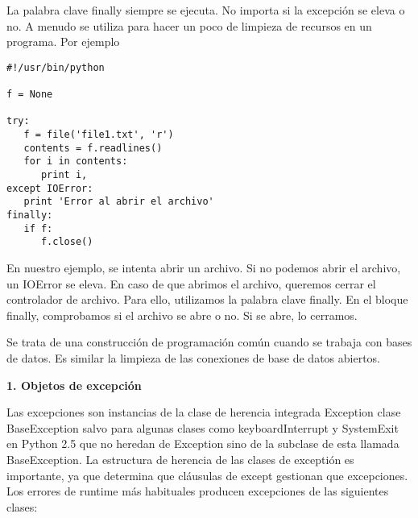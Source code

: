 \documentclass[twoside,10.5pt]{article}%
\begin{document}
\vspace{0.3cm}

La palabra clave {\color{red} finally } siempre se ejecuta. No importa si la excepci\'on se eleva o no. A menudo se utiliza para hacer un poco de limpieza de recursos en un programa. Por ejemplo

\vspace{0.3cm}

\begin{verbatim}
#!/usr/bin/python

f = None

try:
   f = file('file1.txt', 'r')
   contents = f.readlines()
   for i in contents:
      print i,
except IOError:
   print 'Error al abrir el archivo'
finally:
   if f:
      f.close()
\end{verbatim}

\vspace{0.3cm}

En nuestro ejemplo, se intenta abrir un archivo. Si no podemos abrir el archivo, un  {\color{red}IOError } se eleva. En caso de que abrimos el archivo, queremos cerrar el controlador de archivo. Para ello, utilizamos la palabra clave {\color{red} finally}. En el bloque {\color{red} finally}, comprobamos si el archivo se abre o no. Si se abre, lo cerramos.

Se trata de una construcci\'on de programaci\'on com\'un cuando se trabaja con bases de datos. Es  similar la limpieza de las conexiones de base de datos abiertos.


\vspace{0.3cm}

\textbf{1. Objetos de excepci\'on}

\vspace{0.3cm}

Las excepciones son instancias de la clase de herencia integrada {\color{blue} Exception}  clase {\color{blue} BaseException} salvo para algunas clases como {\color{blue} keyboardInterrupt} y {\color{blue} SystemExit} en Python 2.5 que no heredan de {\color{blue} Exception} sino de la subclase de esta llamada {\color{blue} BaseException}. La estructura de herencia de las clases de excepti\'on es importante, ya que determina que cl\'ausulas de {\color{blue}except} gestionan que excepciones. Los errores de {\color{green}runtime} m\'as habituales producen excepciones de las siguientes clases:
\end{document}
